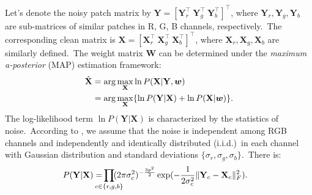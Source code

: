 \documentclass[10pt,twocolumn,letterpaper]{article}
\begin{document}
Let's denote the noisy patch matrix by $\mathbf{Y}=[\mathbf{Y}_{r}^{\top}\ \mathbf{Y}_{g}^{\top}\ \mathbf{Y}_{b}^{\top}]^{\top}$, where $\mathbf{Y}_{r}, \mathbf{Y}_{g}, \mathbf{Y}_{b}$ are sub-matrices of similar patches in R, G, B channels, respectively.\ The corresponding clean matrix is $\mathbf{X}=[\mathbf{X}_{r}^{\top}\ \mathbf{X}_{g}^{\top}\ \mathbf{X}_{b}^{\top}]^{\top}$, where $\mathbf{X}_{r}, \mathbf{X}_{g}, \mathbf{X}_{b}$ are similarly defined.\ The weight matrix $\mathbf{W}$ can be determined under the \emph{maximum a-posterior} (MAP) estimation framework:
\vspace{-3mm}
\begin{equation}
\label{e5}
\vspace{-3mm}
\begin{split}
\hat{\mathbf{X}} 
&=
\arg\max_{\mathbf{X}}\ln P(\mathbf{X}|\mathbf{Y},\bm{w})
\\
&
=
\arg\max_{\mathbf{X}}\{\ln P(\mathbf{Y}|\mathbf{X})+\ln P(\mathbf{X}|\bm{w})\}.
\end{split}
\end{equation}
The log-likelihood term $\ln P(\mathbf{Y}|\mathbf{X})$ is characterized by the
statistics of noise.\ According to \cite{Leungtip}, we assume that the noise is independent among RGB channels and independently and identically distributed (i.i.d.)\ in each channel with Gaussian distribution and standard deviations $\{\sigma_{r}, \sigma_{g}, \sigma_{b}\}$.\ There is:
\vspace{-3mm}
\begin{equation}
\label{e6}
\vspace{-3mm}
\hspace{-3mm}
P(\mathbf{Y}|\mathbf{X})
= 
\hspace{-4mm}
\prod_{c\in\{r, g, b\}}
\hspace{-4mm}
(2\pi\sigma_{c}^{2})^{-\frac{3p^{2}}{2}}
\exp(-\frac{1}{2\sigma_{c}^{2}}\|\mathbf{Y}_{c}-\mathbf{X}_{c}\|_{F}^{2}).
\end{equation}
\end{document}
